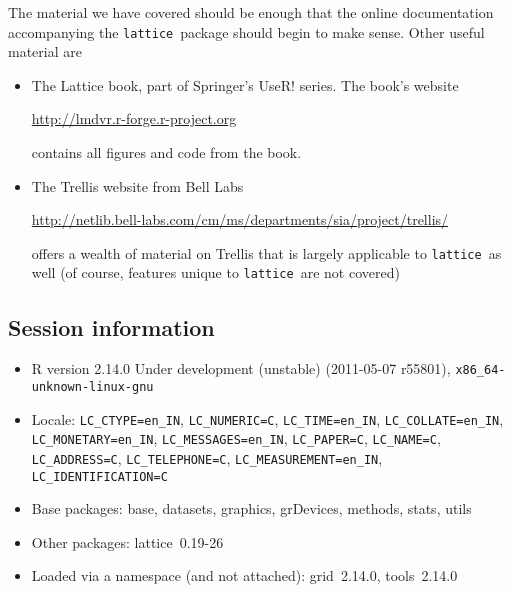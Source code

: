 \documentclass[10pt]{article}
\newcommand{\code}[1]{\texttt{#1}}
\newcommand{\lattice}{\code{lattice}}
\begin{document}
The material we have covered should be enough that the online
documentation accompanying the \lattice\ package should begin to make
sense.  Other useful material are
\begin{itemize}
\item The Lattice book, part of Springer's \textsf{UseR!} series.  The
  book's website
  \begin{center}
    \url{http://lmdvr.r-forge.r-project.org}
  \end{center}
  contains all figures and code from  the book.
\item The Trellis website from Bell Labs
  \begin{center}
    \url{http://netlib.bell-labs.com/cm/ms/departments/sia/project/trellis/}
  \end{center}
  offers a wealth of material on Trellis that is largely applicable to
  \lattice\ as well (of course, features unique to \lattice\ are not
  covered)
\end{itemize}

\subsection*{Session information}

\begin{itemize}\raggedright
  \item R version 2.14.0 Under development (unstable) (2011-05-07 r55801), \verb|x86_64-unknown-linux-gnu|
  \item Locale: \verb|LC_CTYPE=en_IN|, \verb|LC_NUMERIC=C|, \verb|LC_TIME=en_IN|, \verb|LC_COLLATE=en_IN|, \verb|LC_MONETARY=en_IN|, \verb|LC_MESSAGES=en_IN|, \verb|LC_PAPER=C|, \verb|LC_NAME=C|, \verb|LC_ADDRESS=C|, \verb|LC_TELEPHONE=C|, \verb|LC_MEASUREMENT=en_IN|, \verb|LC_IDENTIFICATION=C|
  \item Base packages: base, datasets, graphics, grDevices,
    methods, stats, utils
  \item Other packages: lattice~0.19-26
  \item Loaded via a namespace (and not attached):
    grid~2.14.0, tools~2.14.0
\end{itemize}




\end{document}
